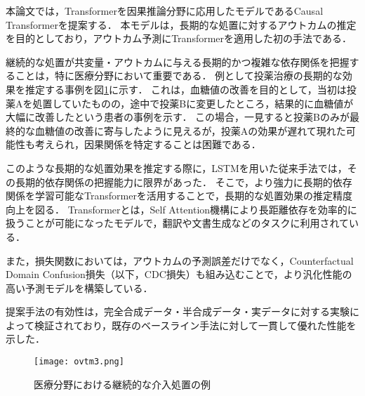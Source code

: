\documentclass[dvipdfmx]{jreport}
\begin{document}
本論文では，Transformerを因果推論分野に応用したモデルであるCausal Transformerを提案する．
本モデルは，長期的な処置に対するアウトカムの推定を目的としており，アウトカム予測にTransformerを適用した初の手法である．

継続的な処置が共変量・アウトカムに与える長期的かつ複雑な依存関係を把握することは，特に医療分野において重要である．
例として投薬治療の長期的な効果を推定する事例を図\ref{fig:ovtm}に示す．
これは，血糖値の改善を目的として，当初は投薬Aを処置していたものの，途中で投薬Bに変更したところ，結果的に血糖値が大幅に改善したという患者の事例を示す．
この場合，一見すると投薬Bのみが最終的な血糖値の改善に寄与したように見えるが，投薬Aの効果が遅れて現れた可能性も考えられ，因果関係を特定することは困難である．

このような長期的な処置効果を推定する際に，LSTMを用いた従来手法では，その長期的依存関係の把握能力に限界があった．
そこで，より強力に長期的依存関係を学習可能なTransformerを活用することで，長期的な処置効果の推定精度向上を図る．
Transformerとは，Self Attention機構により長距離依存を効率的に扱うことが可能になったモデルで，翻訳や文書生成などのタスクに利用されている．

また，損失関数においては，アウトカムの予測誤差だけでなく，Counterfactual Domain Confusion損失（以下，CDC損失）も組み込むことで，より汎化性能の高い予測モデルを構築している．

提案手法の有効性は，完全合成データ・半合成データ・実データに対する実験によって検証されており，既存のベースライン手法に対して一貫して優れた性能を示した．


\begin{figure}[h]
    \begin{center}
        \texttt{[image: ovtm3.png]} 
        \caption{医療分野における継続的な介入処置の例} \label{fig:ovtm}
    \end{center}
\end{figure}
\end{document}
